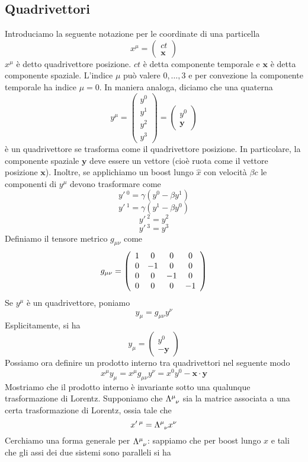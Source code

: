 \documentclass[a4paper,11pt]{book}
\renewcommand{\vec}[1]{\mathbf{#1}}
\theoremstyle{theorem}
\theoremstyle{definition}
\begin{document}
\subsection{Quadrivettori}
Introduciamo la seguente notazione per le coordinate di una particella
\[x^\mu=\left(\begin{array}{c}
ct\\ \vec{x}
\end{array}\right)\]
$x^\mu$ è detto quadrivettore posizione. $ct$ è detta componente temporale e $\vec{x}$ è detta componente spaziale. L'indice $\mu$ può valere $0,\dots,3$ e per convezione la componente temporale ha indice $\mu=0$. In maniera analoga, diciamo che una quaterna
\[y^\mu=\left(\begin{array}{c}
y^0\\y^1\\y^2\\y^3
\end{array}\right)=\left(\begin{array}{c}
y^0\\ \vec{y}
\end{array}\right)\]
è un quadrivettore se trasforma come il quadrivettore posizione. In particolare, la componente spaziale $\vec{y}$ deve essere un vettore (cioè ruota come il vettore posizione $\vec{x}$). Inoltre, se applichiamo un boost lungo $\hat{x}$ con velocità $\beta c$ le componenti di $y^\mu$ devono trasformare come
\[{y'}\,^0=\gamma(y^0-\beta y^1)\]
\[{y'}\,^1=\gamma(y^1-\beta y^0)\]
\[{y'}\,^2=y^2\]
\[{y'}\,^3=y^3\]
Definiamo il tensore metrico $g_{\mu\nu}$ come
\[g_{\mu\nu}=\left(\begin{array}{c c c c}
1&0&0&0\\0&-1&0&0\\0&0&-1&0\\0&0&0&-1
\end{array}\right)\]
Se $y^\mu$ è un quadrivettore, poniamo
\[y_\mu=g_{\mu\nu}y^\nu\]
Esplicitamente, si ha
\[y_\mu=\left(\begin{array}{c}
y^0\\-\vec{y}
\end{array}\right)\]
Possiamo ora definire un prodotto interno tra quadrivettori nel seguente modo
\[x^\mu y_\mu=x^\mu g_{\mu\nu}y^\nu=x^0y^0-\vec{x}\cdot\vec{y}\]
Mostriamo che il prodotto interno è invariante sotto una qualunque trasformazione di Lorentz. Supponiamo che $\Lambda\indices{^\mu_\nu}$ sia la matrice associata a una certa trasformazione di Lorentz, ossia tale che
\[{x'}\,^\mu=\Lambda\indices{^\mu_\nu}x^\nu\]
Cerchiamo una forma generale per $\Lambda\indices{^\mu_\nu}$: sappiamo che per boost lungo $x$ e tali che gli assi dei due sistemi sono paralleli si ha
\end{document}
